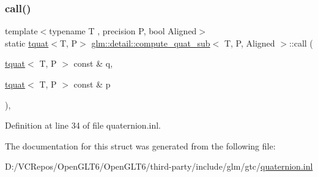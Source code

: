 \subsubsection{\texorpdfstring{call()}{call()}}
{\footnotesize\ttfamily template$<$typename T , precision P, bool Aligned$>$ \\
static \mbox{\hyperlink{structglm_1_1tquat}{tquat}}$<$T, P$>$ \mbox{\hyperlink{structglm_1_1detail_1_1compute__quat__sub}{glm\+::detail\+::compute\+\_\+quat\+\_\+sub}}$<$ T, P, Aligned $>$\+::call (\begin{DoxyParamCaption}\item[{\mbox{\hyperlink{structglm_1_1tquat}{tquat}}$<$ T, P $>$ const \&}]{q,  }\item[{\mbox{\hyperlink{structglm_1_1tquat}{tquat}}$<$ T, P $>$ const \&}]{p }\end{DoxyParamCaption})\hspace{0.3cm}{\ttfamily [inline]}, {\ttfamily [static]}}



Definition at line 34 of file quaternion.\+inl.



The documentation for this struct was generated from the following file\+:\begin{DoxyCompactItemize}
\item 
D\+:/\+V\+C\+Repos/\+Open\+G\+L\+T6/\+Open\+G\+L\+T6/third-\/party/include/glm/gtc/\mbox{\hyperlink{gtc_2quaternion_8inl}{quaternion.\+inl}}\end{DoxyCompactItemize}
